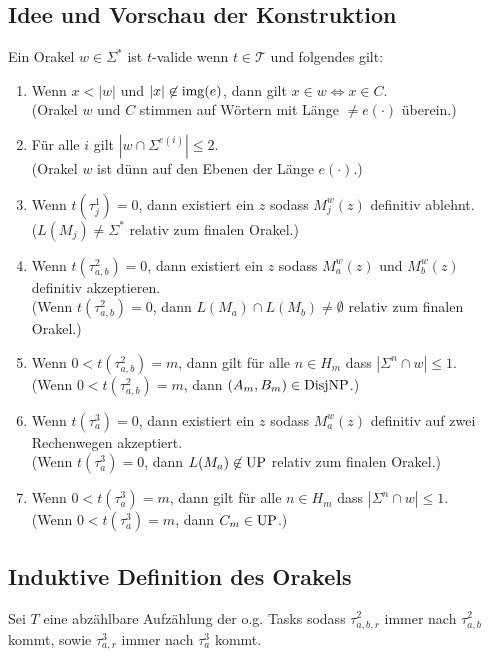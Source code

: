 \subsection*{Idee und Vorschau der Konstruktion}

Ein Orakel $w\in\Sigma^*$ ist $t$-valide wenn $t\in\mathcal T$ und folgendes gilt:
\begin{enumerate}[label={V\arabic*}]
    \item Wenn $x<|w|$ und $|x|\not\in \operatorname{img}(e)$, dann gilt $x\in w\iff x\in C$.\\
        (Orakel $w$ und $C$ stimmen auf Wörtern mit Länge $\neq e(\cdot)$ überein.)
    \item Für alle $i$ gilt $|w\cap \Sigma^{e(i)}|\leq 2$.\\
        (Orakel $w$ ist dünn auf den Ebenen der Länge $e(\cdot)$.)
    \item Wenn $t(\tau^1_j)=0$, dann existiert ein $z$ sodass $M_j^w(z)$ definitiv ablehnt.\\
        ($L(M_j)\neq \Sigma^*$ relativ zum finalen Orakel.)
    \item Wenn $t(\tau^2_{a,b})=0$, dann existiert ein $z$ sodass $M_a^w(z)$ und $M_b^w(z)$ definitiv akzeptieren.\\
        (Wenn $t(\tau^2_{a,b})=0$, dann $L(M_a)\cap L(M_b)\neq \emptyset$ relativ zum finalen Orakel.)
    \item Wenn $0<t(\tau^2_{a,b})=m$, dann gilt für alle $n\in H_m$ dass $|\Sigma^{n}\cap w|\leq 1$.\\
        (Wenn $0<t(\tau^2_{a,b})=m$, dann $(A_m,B_m)\in\mathrm{DisjNP}$.)
    \item Wenn $t(\tau^3_{a})=0$, dann existiert ein $z$ sodass $M_a^w(z)$ definitiv auf zwei Rechenwegen akzeptiert.\\
        (Wenn $t(\tau^3_{a})=0$, dann $L(M_a)\not\in \mathrm{UP}$ relativ zum finalen Orakel.)
    \item Wenn $0<t(\tau^3_{a})=m$, dann gilt für alle $n\in H_m$ dass $|\Sigma^n\cap w|\leq 1$.\\
        (Wenn $0<t(\tau^3_{a})=m$, dann $C_m\in\mathrm{UP}$.)
\end{enumerate}


\subsection*{Induktive Definition des Orakels}

Sei $T$ eine abzählbare Aufzählung der o.g. Tasks sodass $\tau^2_{a,b,r}$ immer nach $\tau^2_{a,b}$ kommt, sowie $\tau^3_{a,r}$ immer nach $\tau^3_a$ kommt.

